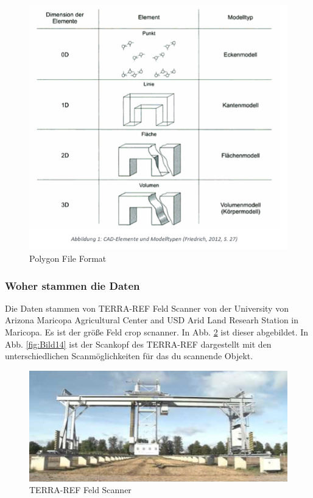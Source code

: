 \documentclass{llncs}
\begin{document}
\begin{figure}[htbp] 
	\centering
	\includegraphics[width=1.0\textwidth]{datenformat.png}
	\caption{Polygon File Format}
	\label{fig:Bild13}
\end{figure}

\subsubsection{Woher stammen die Daten}
Die Daten stammen von TERRA-REF Feld Scanner von der University von Arizona Maricopa Agricultural Center and USD Arid Land Researh Station in Maricopa. Es ist der größe Feld crop scnanner. In Abb. \ref{fig:Bild13} ist dieser abgebildet. In Abb. \ref{fig:Bild14} ist der Scankopf des TERRA-REF dargestellt mit den unterschiedlichen Scanmöglichkeiten für das du scannende Objekt. 
 
\begin{figure}[htbp] 
	\centering
	\includegraphics[width=1.0\textwidth]{lematech_1.png}
	\caption{TERRA-REF Feld Scanner}
	\label{fig:Bild13}
\end{figure}
\end{document}
